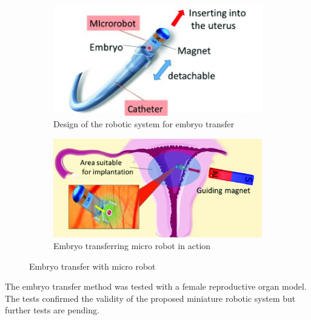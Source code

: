 \begin{figure}[H]
    \centering
    \begin{subfigure}[b]{0.45\textwidth}
        \includegraphics[width=\textwidth]{Figures/embryotransfer_robot.png}
        \caption{Design of the robotic system for embryo transfer}
        \label{fig:et_robot_design}
    \end{subfigure}
    \qquad
    \begin{subfigure}[b]{0.45\textwidth}
        \includegraphics[width=\textwidth]{Figures/embryotransfer_action.png}
        \caption{Embryo transferring micro robot in action}
        \label{fig:et_action}
    \end{subfigure}
    \caption{Embryo transfer with micro robot \cite{embryoTransfer}}
    \label{fig:et}
\end{figure}
The embryo transfer method was tested with a female reproductive organ model. The tests confirmed the validity of the proposed miniature robotic system but further tests are pending. \cite{embryoTransfer}
